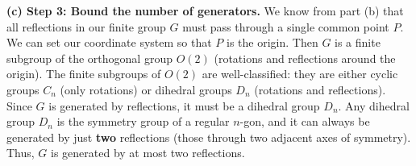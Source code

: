 \begin{solution}
\textbf{(c) Step 3: Bound the number of generators.}
We know from part (b) that all reflections in our finite group $G$ must pass through a single common point $P$.
We can set our coordinate system so that $P$ is the origin. Then $G$ is a finite subgroup of the orthogonal group $O(2)$ (rotations and reflections around the origin).
The finite subgroups of $O(2)$ are well-classified: they are either cyclic groups $C_n$ (only rotations) or dihedral groups $D_n$ (rotations and reflections).
Since $G$ is generated by reflections, it must be a dihedral group $D_n$.
Any dihedral group $D_n$ is the symmetry group of a regular $n$-gon, and it can always be generated by just \textbf{two} reflections (those through two adjacent axes of symmetry).
Thus, $G$ is generated by at most two reflections.
\end{solution}


